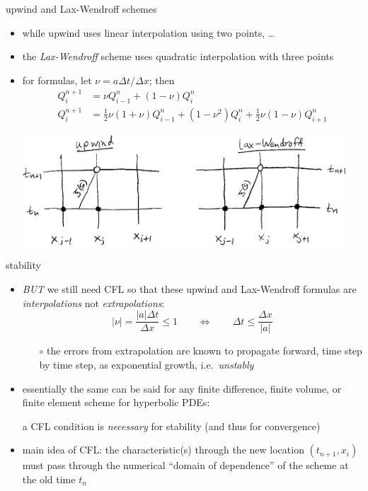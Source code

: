 \documentclass[10pt,hyperref,dvipsnames]{beamer}
\begin{document}
\begin{frame}{upwind and Lax-Wendroff schemes}

\begin{itemize}
\item while upwind uses linear interpolation using two points, \dots
\item the \emph{Lax-Wendroff} scheme uses quadratic interpolation with three points
\item for formulas, let $\nu = a\Delta t/\Delta x$; then
\begin{align*}
Q_i^{n+1} &= \nu Q_{i-1}^n + \left(1 - \nu\right) Q_i^n \\
Q_i^{n+1} &= \tfrac{1}{2} \nu (1+\nu) Q_{i-1}^n + \left(1 - \nu^2\right) Q_i^n + \tfrac{1}{2} \nu (1-\nu) Q_{i+1}^n
\end{align*}

\begin{center}
\includegraphics[width=0.95\textwidth]{figs/stencilssketch}
\end{center}
\end{itemize}
\end{frame}


\begin{frame}{stability}

\begin{itemize}
\item \emph{BUT} we still need CFL so that these upwind and Lax-Wendroff formulas are \emph{interpolations} not \emph{extrapolations}:
    $$|\nu| = \frac{|a|\Delta t}{\Delta x} \le 1 \qquad \iff \qquad \Delta t \le \frac{\Delta x}{|a|}$$

    \begin{itemize}
    \item[$\circ$] the errors from extrapolation are known to propagate forward, time step by time step, as exponential growth, i.e.~\emph{unstably}
    \end{itemize}
\item essentially the same can be said for any finite difference, finite volume, or finite element scheme for hyperbolic PDEs:

\begin{center}
a CFL condition is \emph{necessary} for stability (and thus for convergence)
\end{center}

\item \alert{main idea of CFL:} the characteristic(s) through the new location $(t_{n+1},x_i)$ must pass through the numerical ``domain of dependence'' of the scheme at the old time $t_n$
\end{itemize}
\end{frame}
\end{document}
